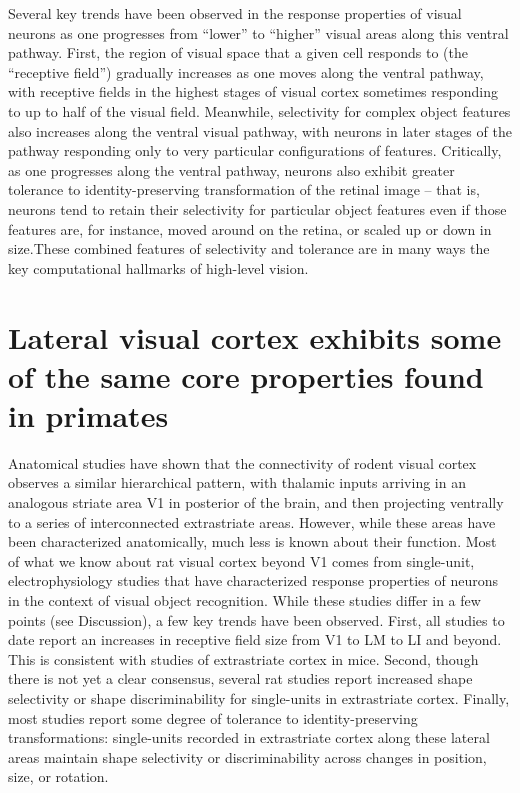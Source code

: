 Several key trends have been observed in the response properties of visual neurons as one progresses from ``lower'' to ``higher'' visual areas along this ventral pathway. First, the region of visual space that a given cell responds to (the ``receptive field'') gradually increases as one moves along the ventral pathway, with receptive fields in the highest stages of visual cortex sometimes responding to up to half of the visual field\cite{op2000spatial}. Meanwhile, selectivity for complex object features also increases along the ventral visual pathway, with neurons in later stages of the pathway responding only to very particular configurations of features\cite{Desimone1984, Logothetis1996}. Critically, as one progresses along the ventral pathway, neurons also exhibit greater tolerance to identity-preserving transformation of the retinal image -- that is, neurons tend to retain their selectivity for particular object features even if those features are, for instance, moved around on the retina, or scaled up or down in size\cite{Ito1995}.These combined features of selectivity and tolerance are in many ways the key computational hallmarks of high-level vision\cite{DiCarlo2007, DiCarlo2012}. 

\section{Lateral visual cortex exhibits some of the same core properties found in primates}
Anatomical studies have shown that the connectivity of rodent visual cortex observes a similar hierarchical pattern, with thalamic inputs arriving in an analogous striate area V1 in posterior of the brain, and then projecting ventrally to a series of interconnected extrastriate areas\cite{Coogan1993}. However, while these areas have been characterized anatomically, much less is known about their function. Most of what we know about rat visual cortex beyond V1 comes from single-unit, electrophysiology studies that have characterized response properties of neurons in the context of visual object recognition\cite{Tafazoli2017, Vermaerke2014, Vinken2016}. While these studies differ in a few points (see Discussion), a few key trends have been observed. First, all studies to date report an increases in receptive field size from V1 to LM to LI and beyond\cite{Tafazoli2017}. This is consistent with studies of extrastriate cortex in mice\cite{Murgas2020, Siegle2021}. Second, though there is not yet a clear consensus, several rat studies report increased shape selectivity or shape discriminability for single-units in extrastriate cortex\cite{Tafazoli2017, Vermaercke2014, Vermaercke2015NeuralDiscriminability}. Finally, most studies report some degree of tolerance to identity-preserving transformations: single-units recorded in extrastriate cortex along these lateral areas maintain shape selectivity or discriminability across changes in position, size, or rotation\cite{Vermaercke2014, Tafazoli2017}.


